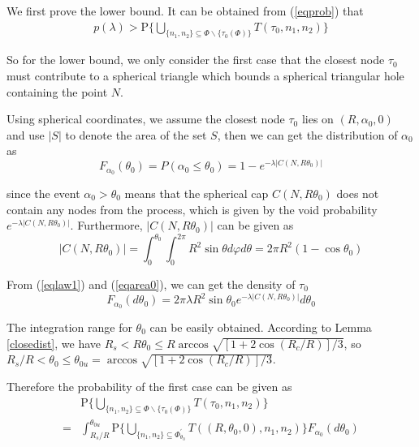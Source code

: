 \documentclass[journal, twoside]{IEEEtran}
\begin{document}
\begin{IEEEproof}
We first prove the lower bound. It can be obtained from (\ref{eqprob}) that
\begin{displaymath} 
  \begin{split}
    p(\lambda) > \mathrm{P}\{\bigcup_{\{n_1, n_2\} \subseteq \Phi
      \backslash \{\tau_0(\Phi)\}} T(\tau_0, n_1, n_2)\} 
  \end{split}
\end{displaymath}

So for the lower bound, we only consider the first case that the closest node $\tau_0$ must contribute to a
spherical triangle which bounds a spherical triangular hole containing the point $N$.

Using spherical coordinates, we assume the closest node $\tau_0$ lies on 
$(R, \alpha_0, 0)$ and use $|S|$ to denote the area of the set $S$, then we can get the distribution of $\alpha_0$ as
\begin{equation} \label{eqlaw1}
   F_{\alpha_0}(\theta_0) = P(\alpha_0 \leq \theta_0) = 1 - e^{-\lambda|C(N, R\theta_0)|}
\end{equation}

\noindent since the event $\alpha_0 > \theta_0$ means that the spherical cap $C(N, R\theta_0)$
does not contain any nodes from the process, which is given by the void probability
$e^{-\lambda|C(N, R\theta_0)|}$. Furthermore, $|C(N, R\theta_0)|$ can be given as 
\begin{equation} \label{eqarea0}
 |C(N, R\theta_0)| =\int_0^{\theta_0} \int_0^{2\pi} R^2 \sin \theta d\varphi d\theta  = 2\pi R^2(1-\cos \theta_0)
\end{equation}

From (\ref{eqlaw1}) and (\ref{eqarea0}), we can get the density of $\tau_0$
\begin{equation} \label{eqdens0}
  F_{\alpha_0}(d\theta_0) = 2\pi \lambda R^2 \sin \theta_0 e^{-\lambda|C(N, R\theta_0)|}d\theta_0 
\end{equation}

The integration range for $\theta_0$ can be easily obtained. According to 
Lemma \ref{closedist}, we have $R_s < R\theta_0 \leq R \arccos \sqrt{[1+2\cos(R_c/R)]/3}$,
so $R_s/R < \theta_0 \leq \theta_{0u} = \arccos \sqrt{[1+2\cos(R_c/R)]/3}$.

Therefore the probability of the first case can be given as 
\begin{equation} \label{eqplower1}
  \begin{split}
    & \mathrm{P}\{\bigcup_{\{n_1, n_2\} \subseteq \Phi \backslash \{\tau_0(\Phi)\}} T(\tau_0, n_1, n_2)\} \\
    = & \int_{R_s/R}^{\theta_{0u}} \mathrm{P}\{\bigcup_{\{n_1, n_2\} \subseteq
      \Phi_{\theta_0}^\prime} T((R, \theta_0, 0), n_1, n_2)\} F_{\alpha_0}(d\theta_0)
  \end{split}
\end{equation}


\end{IEEEproof}
\end{document}
